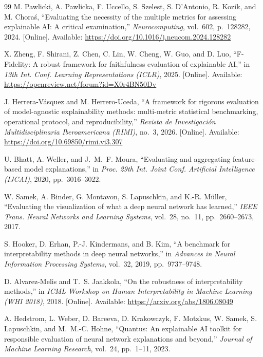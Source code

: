 \documentclass{cleiej}
\begin{document}
\begin{thebibliography}{99}
M. Pawlicki, A. Pawlicka, F. Uccello, S. Szelest, S. D'Antonio, R. Kozik,
and M. Chora\'{s}, ``Evaluating the necessity of the multiple metrics for
assessing explainable AI: A critical examination,'' \emph{Neurocomputing},
vol.~602, p.~128282, 2024. [Online]. Available:
\url{https://doi.org/10.1016/j.neucom.2024.128282}

X. Zheng, F. Shirani, Z. Chen, C. Lin, W. Cheng, W. Guo, and D. Luo,
``F-Fidelity: A robust framework for faithfulness evaluation of explainable
AI,'' in \emph{13th Int. Conf. Learning Representations (ICLR)}, 2025.
[Online]. Available: \url{https://openreview.net/forum?id=X0r4BN50Dv}

J. Herrera-V\'asquez and M. Herrero-Uceda, ``A framework for rigorous
evaluation of model-agnostic explainability methods: multi-metric
statistical benchmarking, operational protocol, and reproducibility,''
\emph{Revista de Investigaci\'on Multidisciplinaria Iberoamericana (RIMI)},
no.~3, 2026. [Online]. Available:
\url{https://doi.org/10.69850/rimi.vi3.307}

U. Bhatt, A. Weller, and J.~M.~F. Moura, ``Evaluating and aggregating
feature-based model explanations,'' in \emph{Proc. 29th Int. Joint Conf.
Artificial Intelligence (IJCAI)}, 2020, pp.~3016--3022.

W. Samek, A. Binder, G. Montavon, S. Lapuschkin, and K.-R. M\"{u}ller,
``Evaluating the visualization of what a deep neural network has learned,''
\emph{IEEE Trans. Neural Networks and Learning Systems}, vol.~28, no.~11,
pp.~2660--2673, 2017.

S. Hooker, D. Erhan, P.-J. Kindermans, and B. Kim, ``A benchmark for
interpretability methods in deep neural networks,'' in \emph{Advances in
Neural Information Processing Systems}, vol.~32, 2019, pp.~9737--9748.

D. Alvarez-Melis and T.~S. Jaakkola, ``On the robustness of
interpretability methods,'' in \emph{ICML Workshop on Human
Interpretability in Machine Learning (WHI 2018)}, 2018. [Online].
Available: \url{https://arxiv.org/abs/1806.08049}

A. Hedstrom, L. Weber, D. Bareeva, D. Krakowczyk, F. Motzkus, W. Samek,
S. Lapuschkin, and M.~M.-C. Hohne, ``Quantus: An explainable AI toolkit for
responsible evaluation of neural network explanations and beyond,''
\emph{Journal of Machine Learning Research}, vol.~24, pp.~1--11, 2023.


\end{thebibliography}
\end{document}
